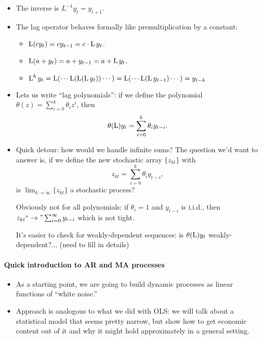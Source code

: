 \begin{itemize}
\item The inverse is $L^{-1} y_t = y_{t+1}$.
\item The lag operator behaves formally like premultiplication by a
  constant:
  \begin{itemize}
  \item $\operatorname{L}(c y_t) = c y_{t-1} = c \cdot \operatorname{L} y_t$.
  \item $\operatorname{L} (a + y_t) = a + y_{t-1} = a + \operatorname{L} y_t$.
  \item $\operatorname{L}^k y_t = \operatorname{L}(\cdots \operatorname{L}(\operatorname{L}(\operatorname{L} y_t)) \cdots) =
    \operatorname{L}(\cdots \operatorname{L}(\operatorname{L} y_{t-1}) \cdots) = y_{t-k}$
  \end{itemize}
\item Lets us write ``lag polynomials'': if we define the polynomial
  $\theta(z) = \sum_{i=0}^k \theta_i z^i$, then
  \begin{equation*}
    \theta(\operatorname{L}) y_t = \sum_{i=0}^k \theta_i y_{t-i}.
  \end{equation*}
\item Quick detour: how would we handle infinite sums? The question
  we'd want to answer is, if we define the new stochastic array
  $\{z_{kt}\}$ with
  \begin{equation*}
    z_{kt} = \sum_{i=0}^k \theta_i y_{t-i},
  \end{equation*}
  is $\lim_{k \to \infty} \{z_{kt}\}$ a stochastic process?

  Obviously not for all polynomials: if $\theta_i = 1$ and $y_{t-i}$
  is i.i.d., then $z_{kt} ``\to" \sum_{i=0}^{\infty} y_{t-i}$ which
  is not tight.

  It's easier to check for weakly-dependent sequences: is
  $\theta(\operatorname{L}) y_t$ weakly-dependent?... (need to fill in details)
\end{itemize}

\paragraph{Quick introduction to AR and MA processes}

\begin{itemize}
\item As a starting point, we are going to build dynamic processes as
  linear functions of ``white noise.''
\item Approach is analogous to what we did with OLS: we will talk
  about a statistical model that seems pretty narrow, but show how to
  get economic content out of it and why it might hold approximately
  in a general setting.
\end{itemize}

